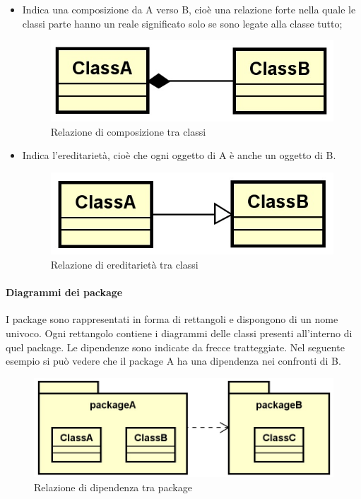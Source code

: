 \begin{itemize}
\item Indica una composizione da A verso B, cioè una relazione forte nella quale le classi parte hanno un reale significato solo se sono legate alla classe tutto;
\begin{figure} [H]
	\centering
	\includegraphics[scale=0.75]{./Img/composizione.jpg}
	\caption{Relazione di composizione tra classi}\label{}
\end{figure}

\item Indica l’ereditarietà, cioè che ogni oggetto di A è anche un oggetto di B.
\begin{figure} [H]
	\centering
	\includegraphics[scale=0.75]{./Img/ereditarieta.jpg}
	\caption{Relazione di ereditarietà tra classi}\label{}
\end{figure}

\end{itemize}

\paragraph{Diagrammi dei package}\Spazio
I package sono rappresentati in forma di rettangoli e dispongono di un nome univoco. Ogni rettangolo contiene i diagrammi delle classi presenti all'interno di quel package. Le dipendenze sono indicate da frecce tratteggiate.
Nel seguente esempio si può vedere che il package A ha una dipendenza nei confronti di B.
\begin{figure} [H]
	\centering
	\includegraphics[scale=0.7]{./Img/package.jpg}
	\caption{Relazione di dipendenza tra package}\label{}
\end{figure}

